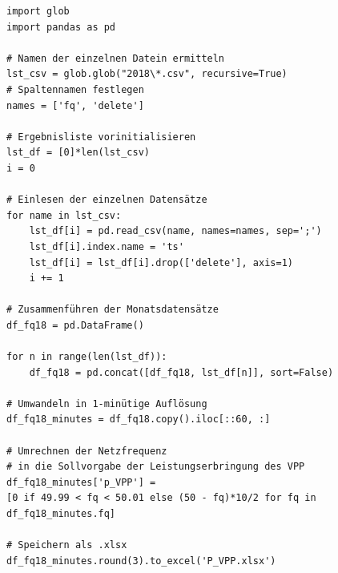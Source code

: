 \begin{code}
\label{code:VPP}
\begin{verbatim}
import glob
import pandas as pd

# Namen der einzelnen Datein ermitteln
lst_csv = glob.glob("2018\*.csv", recursive=True)
# Spaltennamen festlegen
names = ['fq', 'delete']

# Ergebnisliste vorinitialisieren
lst_df = [0]*len(lst_csv)
i = 0

# Einlesen der einzelnen Datensätze
for name in lst_csv:
    lst_df[i] = pd.read_csv(name, names=names, sep=';')
    lst_df[i].index.name = 'ts'
    lst_df[i] = lst_df[i].drop(['delete'], axis=1)
    i += 1
    
# Zusammenführen der Monatsdatensätze
df_fq18 = pd.DataFrame()

for n in range(len(lst_df)):
    df_fq18 = pd.concat([df_fq18, lst_df[n]], sort=False)
    
# Umwandeln in 1-minütige Auflösung
df_fq18_minutes = df_fq18.copy().iloc[::60, :]

# Umrechnen der Netzfrequenz
# in die Sollvorgabe der Leistungserbringung des VPP
df_fq18_minutes['p_VPP'] =
[0 if 49.99 < fq < 50.01 else (50 - fq)*10/2 for fq in df_fq18_minutes.fq]

# Speichern als .xlsx
df_fq18_minutes.round(3).to_excel('P_VPP.xlsx')
\end{verbatim}
\end{code}

\newpage